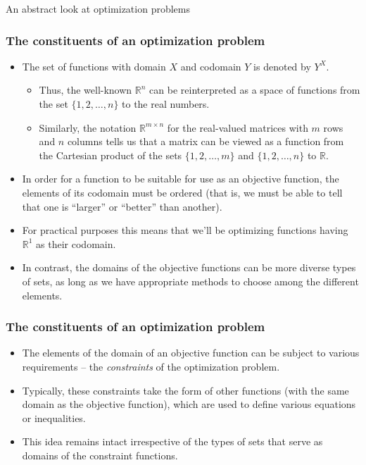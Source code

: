 \documentclass[10pt]{beamer}
\theoremstyle{definition}
\begin{document}
\begin{section}{An abstract look at optimization problems}
\begin{frame}[fragile]
\frametitle{The constituents of an optimization problem}
\begin{itemize} \itemsep1em
\item The set of functions with domain $ X $ and codomain $ Y $ is denoted by $ Y^X $. 
		\begin{itemize}
		\item Thus, the well-known $ \mathbb{R}^n $ can be reinterpreted as a space of functions from the set $ \{1,2,\ldots,n\} $ to the real numbers.
		\item Similarly, the notation $ \mathbb{R}^{m\times n} $ for the real-valued matrices with $ m $ rows and $ n $ columns tells us that a matrix can be viewed as a function from the Cartesian product of the sets $ \{1,2,\ldots,m\} $ and $ \{1,2,\ldots,n\} $ to $ \mathbb{R} $.
		\end{itemize} 
\item In order for a function to be suitable for use as an objective function, the elements of its codomain must be ordered (that is, we must be able to tell that one is ``larger'' or ``better'' than another).
\item For practical purposes this means that we'll be optimizing functions having $ \mathbb{R}^1 $ as their codomain. 
\item In contrast, the domains of the objective functions can be more diverse types of sets, as long as we have appropriate methods to choose among the different elements.
\end{itemize}
\end{frame}

\begin{frame}[fragile]
\frametitle{The constituents of an optimization problem}
\begin{itemize} \itemsep1em
\item The elements of the domain of an objective function can be subject to various requirements -- the \emph{constraints} of the optimization problem.
\item Typically, these constraints take the form of other functions (with the same domain as the objective function), which are used to define various equations or inequalities.
\item This idea remains intact irrespective of the types of sets that serve as domains of the constraint functions.
\end{itemize}
\end{frame}


\end{section}
\end{document}
